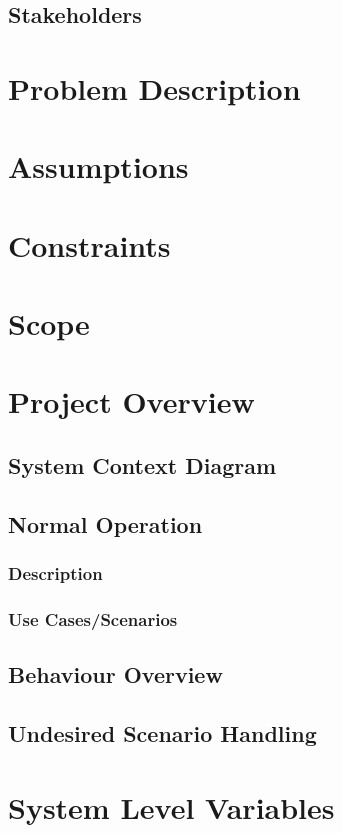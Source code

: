 \documentclass[12pt]{article}
\begin{document}
\subsection{Stakeholders}

\section{Problem Description}

\section{Assumptions}

\section{Constraints}

\section{Scope}

\section{Project Overview}
\subsection{System Context Diagram}
\subsection{Normal Operation}
\subsubsection{Description}
\subsubsection{Use Cases/Scenarios}

\subsection{Behaviour Overview}
\subsection{Undesired Scenario Handling}

\section{System Level Variables}
\end{document}
